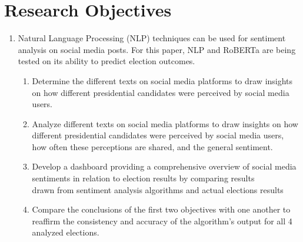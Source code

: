 \section{Research Objectives}
\begin{enumerate}
    \item Natural Language Processing (NLP) techniques can be used for sentiment analysis on social media posts. For this paper, NLP and RoBERTa are being tested on its ability to predict election outcomes.
    \begin{enumerate}
        \item Determine the different texts on social media platforms to draw insights on how different presidential candidates were perceived by social media users.
        \item Analyze different texts on social media platforms to draw insights on how different presidential candidates were perceived by social media users, how often these perceptions are shared, and the general sentiment.
        \item Develop a dashboard providing a comprehensive overview of social media sentiments in relation to election results by comparing results\\drawn from sentiment analysis algorithms and actual elections results
        \item Compare the conclusions of the first two objectives with one another to reaffirm the consistency and accuracy of the algorithm’s output for all 4 analyzed elections.
    \end{enumerate}
\end{enumerate}
